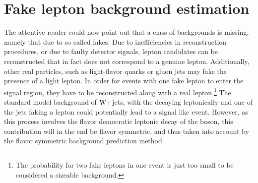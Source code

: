 \section{Fake lepton background estimation}
\noindent\justify
The attentive reader could now point out that a class of backgrounds is missing, namely that due to so called fakes. 
Due to inefficiencies in reconstruction procedures, or due to faulty detector signals, lepton candidates can be reconstructed that in fact does not correspond to a genuine lepton. 
Additionally, other real particles, such as light-flavor quarks or gluon jets may fake the presence of a light lepton. 
In order for events with one fake lepton to enter the signal region, they have to be reconstructed along with a real lepton.\footnote{The probability for two fake leptons in one event is just too small to be considered a sizeable background.}
The standard model background of $\mathrm{W}+$jets, with the \PW decaying leptonically and one of the jets faking a lepton could potentially lead to a signal like event. 
However, as this process involves the flavor democratic leptonic decay of the \PW boson, this contribution will in the end be flavor symmetric, and thus taken into account by the flavor symmetric background prediction method.  

